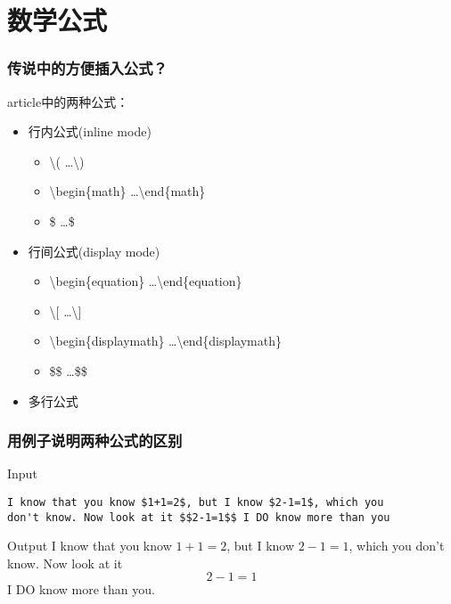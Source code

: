 \section{数学公式}
\begin{frame}[fragile]\frametitle{传说中的方便插入公式？}
article中的两种公式：
    \begin{itemize}
       \item 行内公式(inline mode)
        \begin{itemize}
           \item \textbackslash ( \ldots \textbackslash )
		  \hidark<3> \item \textbackslash begin\{math\} \ldots \textbackslash end\{math\}
		  \hidark<4> \item \$ \ldots \$
        \end{itemize}
       \item 行间公式(display mode)
        \begin{itemize}
           \item \textbackslash begin\{equation\} \ldots \textbackslash end\{equation\}
		  \hidark<7> \item \textbackslash [ \ldots \textbackslash ]
		  \hidark<8> \item \textbackslash begin\{displaymath\} \ldots \textbackslash end\{displaymath\}
		  \hidark<9> \item \$\$ \ldots \$\$
        \end{itemize}
       \item 多行公式
    \end{itemize}
\end{frame}

\begin{frame}[fragile]\frametitle{用例子说明两种公式的区别}
    \begin{block}{Input}
    \begin{verbatim}
I know that you know $1+1=2$, but I know $2-1=1$, which you
don't know. Now look at it $$2-1=1$$ I DO know more than you
    \end{verbatim}
    \end{block}
    \begin{block}{Output}
        I know that you know $1+1=2$, but I know $2-1=1$, which you don't know. Now look at it $$2-1=1$$ I DO know more than you.
    \end{block}
\end{frame}

